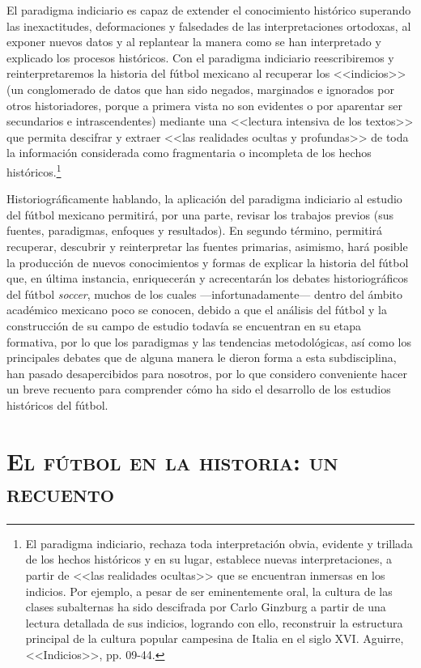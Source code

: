 \documentclass[11pt,a5paper,twoside]{book} %
\begin{document}
El paradigma indiciario es capaz de extender el conocimiento histórico superando las
inexactitudes, deformaciones y falsedades de las interpretaciones ortodoxas, al exponer
nuevos datos y al replantear la manera como se han interpretado y explicado los procesos
históricos. Con el paradigma indiciario reescribiremos y reinterpretaremos la historia del fútbol mexicano al recuperar los <<indicios>> (un conglomerado de datos que han sido negados, marginados e ignorados por otros historiadores, porque a primera vista no son evidentes o por aparentar ser secundarios e intrascendentes) mediante una <<lectura intensiva de los textos>> que permita descifrar y extraer <<las realidades ocultas y profundas>> de toda la información considerada como fragmentaria o incompleta de los hechos históricos.\footnote{El paradigma indiciario, rechaza toda interpretación obvia, evidente y trillada de los hechos históricos y en su lugar, establece nuevas interpretaciones, a partir de <<las realidades ocultas>> que se encuentran inmersas en los indicios. Por ejemplo, a pesar de ser eminentemente oral, la cultura de las clases subalternas ha sido descifrada por Carlo Ginzburg a partir de una lectura detallada de sus indicios, logrando con ello, reconstruir la estructura principal de la cultura popular campesina de Italia en el siglo XVI. Aguirre, <<Indicios>>, pp. 09-44.}

Historiográficamente hablando, la aplicación del paradigma indiciario al estudio del
fútbol mexicano permitirá, por una parte, revisar los trabajos previos (sus fuentes,
paradigmas, enfoques y resultados). En segundo término, permitirá recuperar, descubrir y
reinterpretar las fuentes primarias, asimismo, hará posible la producción de nuevos conocimientos y formas de explicar la historia del fútbol que, en última instancia,
enriquecerán y acrecentarán los debates historiográficos del fútbol \emph{soccer}, muchos de los
cuales ---infortunadamente--- dentro del ámbito académico mexicano poco se conocen, debido
a que el análisis del fútbol y la construcción de su campo de estudio todavía se encuentran en
su etapa formativa, por lo que los paradigmas y las tendencias metodológicas, así como los
principales debates que de alguna manera le dieron forma a esta subdisciplina, han pasado
desapercibidos para nosotros, por lo que considero conveniente hacer un breve recuento para
comprender cómo ha sido el desarrollo de los estudios históricos del fútbol.

\section*{\mdseries\large\textsc{El fútbol en la historia: un recuento}}
\end{document}
